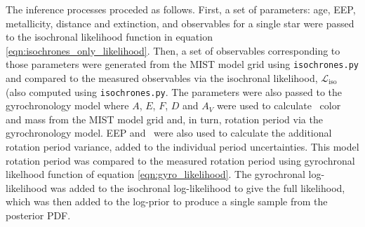 The inference processes proceded as follows.
First, a set of parameters: age, EEP, metallicity, distance and extinction,
and observables for a single star were passed to the isochronal likelihood
function in equation \eqref{eqn:isochrones_only_likelihood}.
Then, a set of observables corresponding to those parameters were generated
from the MIST model grid using {\tt isochrones.py} and compared to the
measured observables via the isochronal likelihood,
$\mathcal{L}_{\mathrm{iso}}$ (also computed using {\tt isochrones.py}.
The parameters were also passed to the gyrochronology model where $A$, $E$,
$F$, $D$ and $A_V$ were used to calculate \gcolor\ color and mass from the
MIST model grid and, in turn, rotation period via the gyrochronology model.
EEP and \gcolor\ were also used to calculate the additional rotation period
variance, added to the individual period uncertainties.
This model rotation period was compared to the measured rotation period using
gyrochronal likelhood function of equation \ref{eqn:gyro_likelihood}.
The gyrochronal log-likelihood was added to the isochronal log-likelihood to
give the full likelihood, which was then added to the log-prior to produce a
single sample from the posterior PDF.


